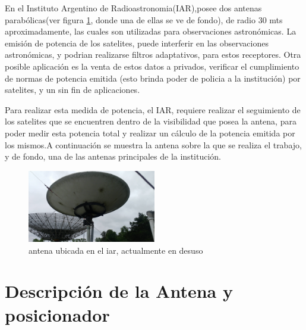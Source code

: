En el Instituto Argentino de Radioastronomia(IAR),posee dos antenas parabólicas(ver figura \ref{fig_antena}, donde una de ellas se ve de fondo), de radio 30 mts aproximadamente, las cuales son utilizadas para observaciones astronómicas. La emisión de potencia de los satelites, puede interferir en las observaciones astronómicas, y podrian realizarse filtros adaptativos, para estos receptores. Otra posible aplicación es la venta de estos datos a privados, verificar el cumplimiento de normas de potencia emitida (esto brinda poder de policia a la institución) por satelites, y un sin fin de aplicaciones. 

Para realizar esta medida de potencia, el IAR, requiere realizar el seguimiento de los satelites que se encuentren dentro de la visibilidad que posea la antena, para poder medir esta potencia total y realizar un cálculo de la potencia emitida por los mismos.A continuación se muestra la antena sobre la que se realiza el trabajo, y de fondo, una de las antenas principales de la institución.   

\begin{figure}[h]
	\centering 
	\includegraphics[width=0.5\textwidth]{parte_1/cap1/antena}
	\caption{antena ubicada en el iar, actualmente en desuso}
	\label{fig_antena}
\end{figure}

\section{Descripción de la Antena y posicionador }

